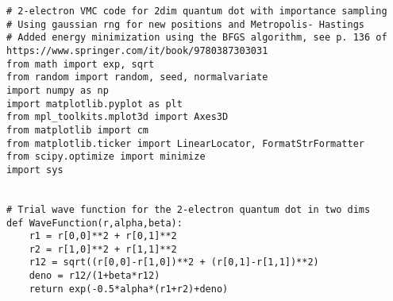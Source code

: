 \documentclass{beamer}
\begin{document}
\begin{frame}




















































































\begin{verbatim}
# 2-electron VMC code for 2dim quantum dot with importance sampling
# Using gaussian rng for new positions and Metropolis- Hastings 
# Added energy minimization using the BFGS algorithm, see p. 136 of https://www.springer.com/it/book/9780387303031
from math import exp, sqrt
from random import random, seed, normalvariate
import numpy as np
import matplotlib.pyplot as plt
from mpl_toolkits.mplot3d import Axes3D
from matplotlib import cm
from matplotlib.ticker import LinearLocator, FormatStrFormatter
from scipy.optimize import minimize
import sys


# Trial wave function for the 2-electron quantum dot in two dims
def WaveFunction(r,alpha,beta):
    r1 = r[0,0]**2 + r[0,1]**2
    r2 = r[1,0]**2 + r[1,1]**2
    r12 = sqrt((r[0,0]-r[1,0])**2 + (r[0,1]-r[1,1])**2)
    deno = r12/(1+beta*r12)
    return exp(-0.5*alpha*(r1+r2)+deno)


\end{verbatim}
\end{frame}
\end{document}
